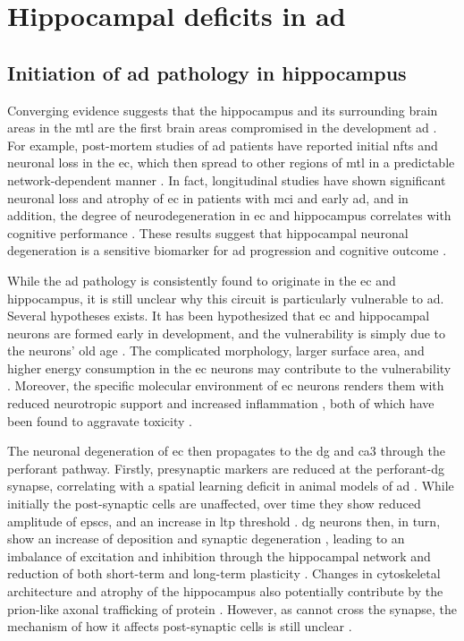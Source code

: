 \section{Hippocampal deficits in \gls{ad}}
\subsection{Initiation of \gls{ad} pathology in hippocampus}
Converging evidence suggests that the hippocampus and its surrounding brain areas in the \gls{mtl} are the first brain areas compromised in the development \gls{ad} \citep{palmer11, zhou16}. For example, post-mortem studies of \gls{ad} patients have reported initial \glspl{nft} and neuronal loss in the \gls{ec}, which then spread to other regions of \gls{mtl} in a predictable network-dependent manner \citep{braak91,  hoesen93, zhan09}. In fact, longitudinal studies have shown significant neuronal loss and atrophy of \gls{ec} in patients with \gls{mci} and early \gls{ad}, and in addition, the degree of neurodegeneration in \gls{ec} and hippocampus correlates with cognitive performance \citep{kordower01, jack02, pennanen04}. These results suggest that hippocampal neuronal degeneration is a sensitive biomarker for \gls{ad} progression and cognitive outcome \citep{jack02, zhou16}. 

While the \gls{ad} pathology is consistently found to originate in the \gls{ec} and hippocampus, it is still unclear why this circuit is particularly vulnerable to \gls{ad}. Several hypotheses exists. It has been hypothesized that \gls{ec} and hippocampal neurons are formed early in development, and the vulnerability is simply due to the neurons' old age \citep{rakic81}. The complicated morphology, larger surface area, and higher energy consumption in the \gls{ec} neurons may contribute to the vulnerability \citep{hevner92, buckmaster04}. Moreover, the specific molecular environment of \gls{ec} neurons renders them with reduced neurotropic support \citep{narisawa-saito96, peterson96} and increased inflammation \citep{janelsins05, okun10}, both of which have been found to aggravate \abeta{} toxicity \citep{tang08, stranahan10}.

The neuronal degeneration of \gls{ec} then propagates to the \gls{dg} and \gls{ca3} through the perforant pathway. Firstly, presynaptic markers are reduced at the perforant-\gls{dg} synapse, correlating with a spatial learning deficit in animal models of \gls{ad} \citep{smith00}. While initially the post-synaptic cells are unaffected, over time they show reduced amplitude of \glspl{epsc}, and an increase in \gls{ltp} threshold \citep{calhoun08, barnes80, barnes00}. \Gls{dg} neurons then, in turn, show an increase of \abeta{} deposition and synaptic degeneration \citep{reilly03, dong07}, leading to an imbalance of excitation and inhibition through the hippocampal network and reduction of both short-term and long-term plasticity \citep{palop07}. Changes in cytoskeletal architecture and atrophy of the hippocampus also potentially contribute by the prion-like axonal trafficking of \atau{} protein \citep{clavaguera09}. However, as \atau{} cannot cross the synapse, the mechanism of how it affects post-synaptic cells is still unclear \citep{stranahan10}.  

